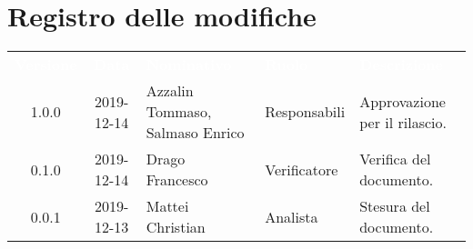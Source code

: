 \section*{Registro delle modifiche}
{
\renewcommand{\arraystretch}{1.5}
\centering
\begin{longtable}{ c c  C{4cm}  C{3cm} C{4cm}}
\textcolor{white}{\textbf{Versione}} & \textcolor{white}{\textbf{Data}} & \textcolor{white}{\textbf{Nominativo}} & \textcolor{white}{\textbf{Ruolo}} & \textcolor{white}{\textbf{Descrizione}}\\	


1.0.0 & 2019-12-14 & Azzalin Tommaso, Salmaso Enrico & Responsabili & Approvazione per il rilascio.  \\
        
0.1.0 & 2019-12-14 & Drago Francesco & Verificatore & Verifica del documento.  \\
		
0.0.1 & 2019-12-13 & Mattei Christian & Analista & Stesura del documento.  \\
		
		
\end{longtable}
}
